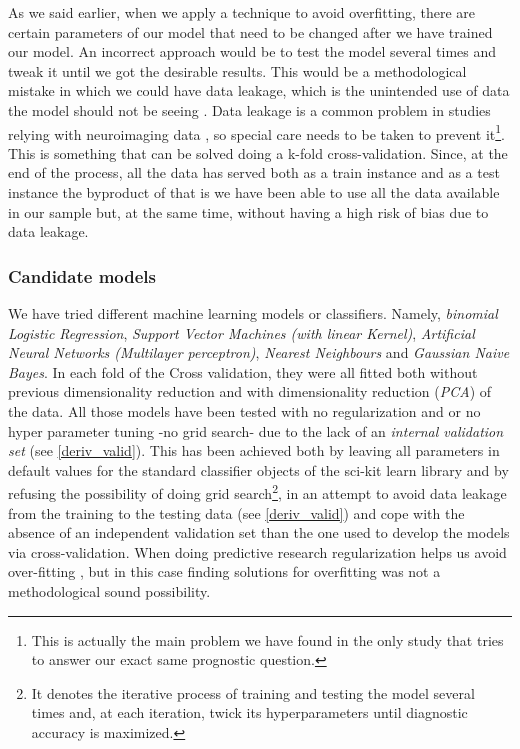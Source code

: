\documentclass[a4paper,12pt]{elsarticle}  %
\begin{document}
As we said earlier, when we apply a technique to avoid overfitting, there are certain parameters of our model that need to be changed after we have trained our model. An incorrect approach would be to test the model several times and tweak it until we got the desirable results. This would be a methodological mistake in which we could have data leakage, which is the unintended use of data the model should not be seeing \cite{Luo2016}. Data leakage is a common problem in studies relying with neuroimaging data \cite{Kriegeskorte2009535}, so special care needs to be taken to prevent it\footnote{This is actually the main problem we have found in the only study that tries to answer our exact same prognostic question\cite{Hojjati201769}.}. This is something that can be solved doing a k-fold cross-validation. Since, at the end of the process, all the data has served both as a train instance and as a test instance the byproduct of that is we have been able to use all the data available in our sample but, at the same time, without having a high risk of bias due to data leakage. 











\subsubsection{Candidate models} \label{used_models}


We have tried different machine learning models or classifiers. Namely, \textit{binomial Logistic Regression}, \textit{Support Vector Machines (with linear Kernel)}, \textit{Artificial Neural Networks (Multilayer perceptron)}, \textit{Nearest Neighbours} and \textit{Gaussian Naive Bayes}. In each fold of the Cross validation, they were all fitted both without previous dimensionality reduction and with dimensionality reduction (\textit{PCA}) of the data. All those models have been tested with no regularization and or no hyper parameter tuning -no grid search- due to the lack of an \textit{internal validation set} (see \ref{deriv_valid}). This has been achieved both by leaving all parameters in default values for the standard classifier objects of the sci-kit learn library and by refusing the possibility of doing grid search\footnote{It denotes the iterative process of training and testing the model several times and, at each iteration, twick its hyperparameters until diagnostic accuracy is maximized.}, in an attempt to avoid data leakage from the training to the testing data (see \ref{deriv_valid}) and cope with the absence of an independent validation set than the one used to develop the models via cross-validation. When doing predictive research regularization helps us avoid over-fitting \cite{Arbabshirani2017137}, but in this case finding solutions for overfitting was not a methodological sound possibility.
\end{document}
